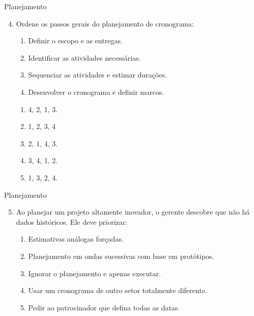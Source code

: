 \documentclass{beamer}
\begin{document}
\begin{frame}{Planejamento}
	\begin{enumerate}
		\setcounter{enumi}{3}
		\justifying
		\item Ordene os passos gerais do planejamento de cronograma:
		\begin{enumerate}[I]
			\item Definir o escopo e as entregas.
			\item Identificar as atividades necessárias.
			\item Sequenciar as atividades e estimar durações.
			\item Desenvolver o cronograma e definir marcos.
		\end{enumerate}
		\begin{enumerate}[a]
			\item 4, 2, 1, 3.
			\item \alert<2>{1, 2, 3, 4}
			\item 2, 1, 4, 3.
			\item 3, 4, 1, 2.
			\item 1, 3, 2, 4.
		\end{enumerate}
	\end{enumerate}
\end{frame}

\begin{frame}{Planejamento}
	\begin{enumerate}
		\setcounter{enumi}{4}
		\justifying
		\item Ao planejar um projeto altamente inovador, o gerente descobre que não há dados históricos. Ele deve priorizar:
		\begin{enumerate}[a]
			\item Estimativas análogas forçadas.
			\item \alert<2>{Planejamento em ondas sucessivas com base em protótipos.}
			\item Ignorar o planejamento e apenas executar.
			\item Usar um cronograma de outro setor totalmente diferente.
			\item Pedir ao patrocinador que defina todas as datas.
		\end{enumerate}
	\end{enumerate}
\end{frame}

\end{document}
